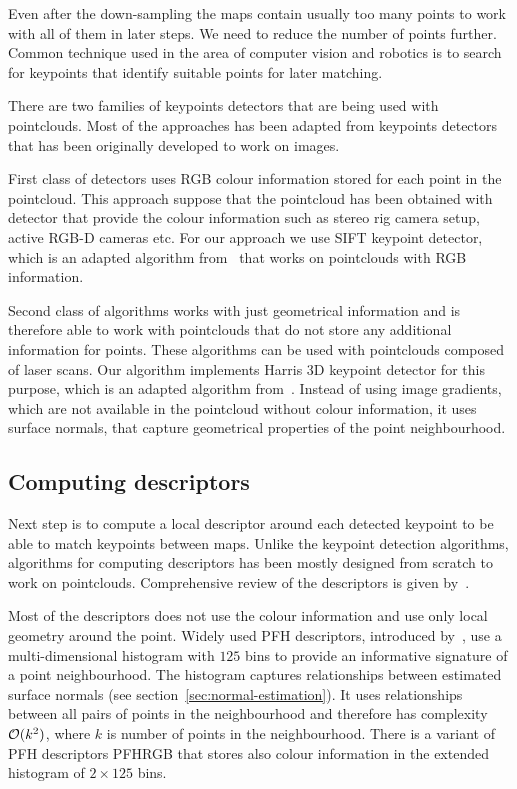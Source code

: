 Even after the down-sampling the maps contain usually too many points to work with all of them in later steps. We need to reduce the number of points further. Common technique used in the area of computer vision and robotics is to search for keypoints that identify suitable points for later matching.

There are two families of keypoints detectors that are being used with pointclouds. Most of the approaches has been adapted from keypoints detectors that has been originally developed to work on images.

First class of detectors uses \gls{RGB} colour information stored for each point in the pointcloud. This approach suppose that the pointcloud has been obtained with detector that provide the colour information such as stereo rig camera setup, active \gls{RGB-D} cameras etc. For our approach we use \gls{SIFT} keypoint detector, which is an adapted algorithm from~\citet{lowe2004distinctive} that works on pointclouds with \gls{RGB} information.

Second class of algorithms works with just geometrical information and is therefore able to work with pointclouds that do not store any additional information for points. These algorithms can be used with pointclouds composed of laser scans. Our algorithm implements Harris \gls{3D} keypoint detector for this purpose, which is an adapted algorithm from~\citet{harris1988combined}. Instead of using image gradients, which are not available in the pointcloud without colour information, it uses surface normals, that capture geometrical properties of the point neighbourhood.

\subsection{Computing descriptors}
\label{sec:compute-descriptors}

Next step is to compute a local descriptor around each detected keypoint to be able to match keypoints between maps. Unlike the keypoint detection algorithms, algorithms for computing descriptors has been mostly designed from scratch to work on pointclouds. Comprehensive review of the descriptors is given by~\citet{YasirThesis}.

Most of the descriptors does not use the colour information and use only local geometry around the point. Widely used \gls{PFH} descriptors, introduced by~\citet{rusu2008pfh}, use a multi-dimensional histogram with $125$ bins to provide an informative signature of a point neighbourhood. The histogram captures relationships between estimated surface normals (see section~\ref{sec:normal-estimation}). It uses relationships between all pairs of points in the neighbourhood and therefore has complexity $\operatorname{\mathcal{O}}(k^2)$, where $k$ is number of points in the neighbourhood. There is a variant of \gls{PFH} descriptors \gls{PFHRGB} that stores also colour information in the extended histogram of $2 \times 125$ bins.

